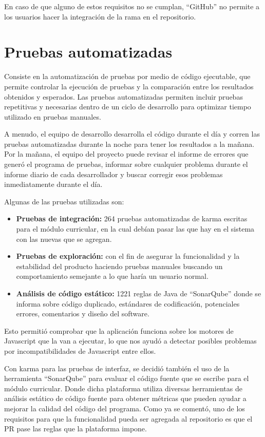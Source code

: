 En caso de que alguno de estos requisitos no se cumplan, \enquote{GitHub} no permite a los usuarios hacer la integración de la rama en el repositorio.

\section{Pruebas automatizadas}
Consiste en la automatización de pruebas por medio de código ejecutable, que permite controlar la ejecución de pruebas y la comparación entre los resultados obtenidos y esperados. Las pruebas automatizadas permiten incluir pruebas repetitivas y necesarias dentro de un ciclo de desarrollo para optimizar tiempo utilizado en pruebas manuales\citep{crispin2009agile}.

A menudo, el equipo de desarrollo desarrolla el código durante el día y corren las pruebas automatizadas durante la noche para tener los resultados a la mañana. Por la mañana, el equipo del proyecto puede revisar el informe de errores que generó el programa de pruebas, informar sobre cualquier problema durante el informe diario de cada desarrollador y buscar corregir esos problemas inmediatamente durante el día.

Algunas de las pruebas utilizadas son:
\begin{itemize}
	\item \textbf{Pruebas de integración:} 264 pruebas automatizadas de karma escritas para el módulo curricular, en la cual debían pasar las que hay en el sistema con las nuevas que se agregan.
	\item \textbf{Pruebas de exploración:} con el fin de asegurar la funcionalidad y la estabilidad del producto haciendo pruebas manuales buscando un comportamiento semejante a lo que haría un usuario normal.
	\item \textbf{Análisis de código estático:} 1221 reglas de Java de \enquote{SonarQube} donde se informa sobre código duplicado, estándares de codificación, potenciales errores, comentarios y diseño del software.
\end{itemize}

Esto permitió comprobar que la aplicación funciona sobre los motores de Javascript que la van a ejecutar, lo que nos ayudó a detectar posibles problemas por incompatibilidades de Javascript entre ellos.

Con karma para las pruebas de interfaz, se decidió también el uso de la herramienta \enquote{SonarQube} para evaluar el código fuente que se escribe para el módulo curricular. Donde dicha plataforma utiliza diversas herramientas de análisis estático de código fuente para obtener métricas que pueden ayudar a mejorar la calidad del código del programa. Como ya se comentó, uno de los requisitos para que la funcionalidad pueda ser agregada al repositorio es que el PR pase las reglas que la plataforma impone.

